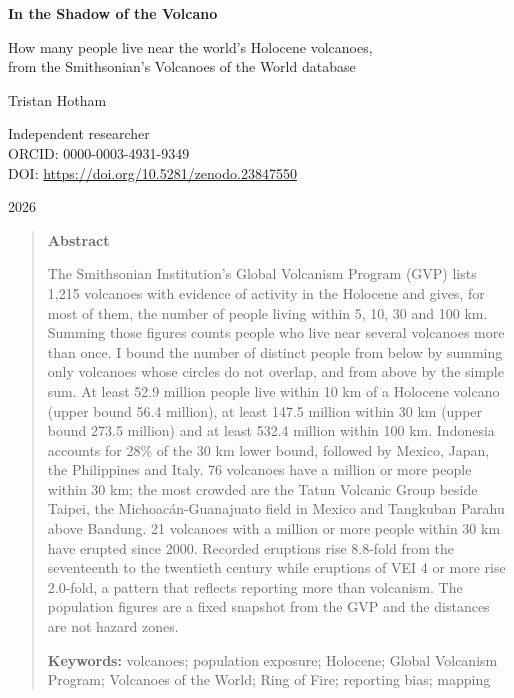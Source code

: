 \documentclass[11pt,a4paper]{article}
\begin{document}
\begin{center}
{\Large\bfseries In the Shadow of the Volcano\par}
\vspace{0.4em}
{\large How many people live near the world's Holocene volcanoes,\\from the Smithsonian's Volcanoes of the World database\par}
\vspace{1.2em}
{\large Tristan Hotham\par}
\vspace{0.3em}
{\small Independent researcher\\
ORCID: 0000-0003-4931-9349\\
DOI: \href{https://doi.org/10.5281/zenodo.23847550}{https://doi.org/10.5281/zenodo.23847550}\par}
\vspace{0.8em}
2026
\end{center}

\begin{quote}
\small
\begin{center}\textbf{Abstract}\end{center}
The Smithsonian Institution's Global Volcanism Program (GVP) lists 1,215 volcanoes with evidence of activity in the Holocene and gives, for most of them, the number of people living within 5, 10, 30 and 100 km. Summing those figures counts people who live near several volcanoes more than once. I bound the number of distinct people from below by summing only volcanoes whose circles do not overlap, and from above by the simple sum. At least 52.9 million people live within 10 km of a Holocene volcano (upper bound 56.4 million), at least 147.5 million within 30 km (upper bound 273.5 million) and at least 532.4 million within 100 km. Indonesia accounts for 28\% of the 30 km lower bound, followed by Mexico, Japan, the Philippines and Italy. 76 volcanoes have a million or more people within 30 km; the most crowded are the Tatun Volcanic Group beside Taipei, the Michoac\'an-Guanajuato field in Mexico and Tangkuban Parahu above Bandung. 21 volcanoes with a million or more people within 30 km have erupted since 2000. Recorded eruptions rise 8.8-fold from the seventeenth to the twentieth century while eruptions of VEI 4 or more rise 2.0-fold, a pattern that reflects reporting more than volcanism. The population figures are a fixed snapshot from the GVP and the distances are not hazard zones.

\textbf{Keywords:} volcanoes; population exposure; Holocene; Global Volcanism Program; Volcanoes of the World; Ring of Fire; reporting bias; mapping
\end{quote}
\end{document}
